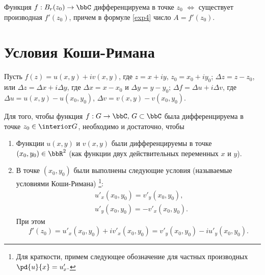 \begin{lemm}
Функция $f : B_r(z_0) \to \bbC $ дифференцируема в точке $z_0$ $\Longleftrightarrow$ существует производная $f'(z_0)$, причем в формуле \eqref{exp4} число $A=f'(z_0)$.
\end{lemm}

\section{Условия Коши-Римана}  
Пусть $f(z)=u(x,y)+iv(x,y)$, где $z=x+iy$, $z_0=x_0+iy_0$; $\Delta z=z-z_0$, или $\Delta z = \Delta x + i\Delta y$, где $\Delta x = x-x_0$ и $\Delta y =y-y_0$; $\Delta f = \Delta u + i\Delta v$, где $\Delta u = u(x,y)-u(x_0,y_0)$,  $\Delta v = v(x,y)-v(x_0,y_0)$. 
\begin{thm} 
Для того, чтобы функция $f: G  \to \bbC,\, G \subset \bbC$ была дифференцируема в точке $z_0\in \interior G$, необходимо и достаточно, чтобы
\begin{enumerate}
\item
Функции $u(x,y)$ и $v(x,y)$ были дифференцируемы в точке $(x_0,y_0) \in \bbR^2$ (как функции двух действительных переменных $x$ и $y$).
\item
В точке  $(x_0,y_0)$ были выполнены следующие условия (называемые условиями Коши-Римана) \footnote{Для краткости, примем следующее обозначение для частных производных $\pd{\textstyle u}{ \textstyle x}=u'_x.$}:
\begin{equation}
\label{exp17}
\begin{split}
&u'_x(x_0,y_0) = v'_y(x_0,y_0), \\ &u'_y(x_0,y_0) = -v'_x(x_0,y_0).
\end{split}
\end{equation}
При этом
\begin{equation}
\label{exp8}
f'(z_0) = u'_x(x_0,y_0) + iv'_x(x_0,y_0)= v'_y(x_0,y_0) -iu'_y(x_0,y_0).
\end{equation}
\end{enumerate}
\end{thm}

